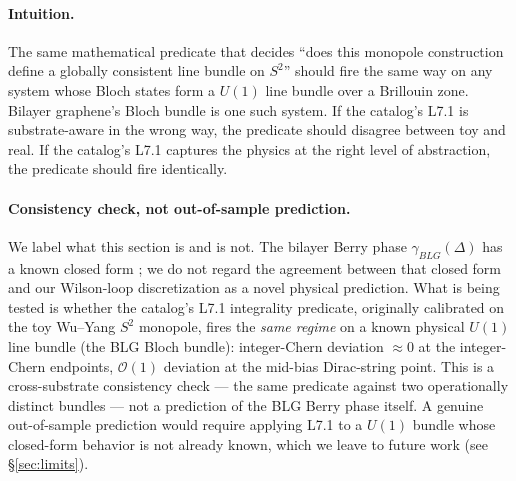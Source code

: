 \documentclass[11pt,letterpaper]{article}
\begin{document}
\paragraph{Intuition.}
The same mathematical predicate that decides ``does this monopole
construction define a globally consistent line bundle on $S^2$''
should fire the same way on any system whose Bloch states form a
$U(1)$ line bundle over a Brillouin zone. Bilayer graphene's Bloch
bundle is one such system. If the catalog's L7.1 is substrate-aware
in the wrong way, the predicate should disagree between toy and
real. If the catalog's L7.1 captures the physics at the right level
of abstraction, the predicate should fire identically.

\paragraph{Consistency check, not out-of-sample prediction.}
We label what this section is and is not. The bilayer Berry phase
$\gamma_{BLG}(\Delta)$ has a known closed form
\cite{mccann2013bilayer}; we do not regard the agreement between
that closed form and our Wilson-loop discretization as a novel
physical prediction. What is being tested is whether the catalog's
L7.1 integrality predicate, originally calibrated on the toy
Wu--Yang $S^2$ monopole, fires the \emph{same regime} on a known
physical $U(1)$ line bundle (the BLG Bloch bundle): integer-Chern
deviation $\approx 0$ at the integer-Chern endpoints, $\mathcal{O}(1)$
deviation at the mid-bias Dirac-string point. This is a
cross-substrate consistency check --- the same predicate against
two operationally distinct bundles --- not a prediction of the BLG
Berry phase itself. A genuine out-of-sample prediction would
require applying L7.1 to a $U(1)$ bundle whose closed-form
behavior is not already known, which we leave to future work
(see \S\ref{sec:limits}).
\end{document}
